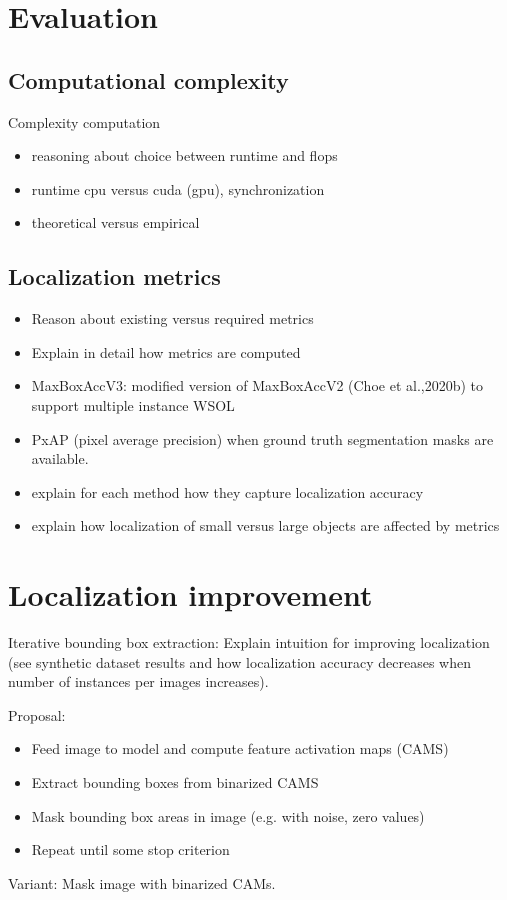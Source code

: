 \section{Evaluation}
\subsection{Computational complexity}
Complexity computation
\begin{itemize}
    \item reasoning about choice between runtime and flops
    \item runtime cpu versus cuda (gpu), synchronization
    \item theoretical versus empirical
\end{itemize}

\subsection{Localization metrics}
\begin{itemize}
    \item Reason about existing versus required metrics
    \item Explain in detail how metrics are computed
    \item MaxBoxAccV3: modified version of MaxBoxAccV2 (Choe et al.,2020b) to support multiple instance WSOL
    \item PxAP (pixel average precision) when ground truth segmentation masks are available.
    \item explain for each method how they capture localization accuracy
    \item explain how localization of small versus large objects are affected by metrics
\end{itemize}

\section{Localization improvement}
Iterative bounding box extraction: Explain intuition for improving localization (see synthetic dataset results and how localization accuracy decreases when number of instances per images increases).

Proposal:
\begin{itemize}
    \item Feed image to model and compute feature activation maps (CAMS)
    \item Extract bounding boxes from binarized CAMS
    \item Mask bounding box areas in image (e.g. with noise, zero values)
    \item Repeat until some stop criterion
\end{itemize}
Variant: Mask image with binarized CAMs.

